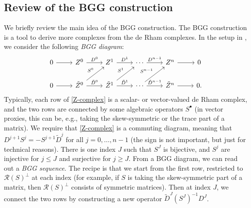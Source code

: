 \documentclass[final]{amsart}%
\newcommand{\0}{\mathaccent23}
\newcommand\ran{\mathcal{R}}
\newcommand{\bs}{{\scriptscriptstyle \bullet}}
\begin{document}
\subsection{Review of the BGG construction}

We briefly review the main idea of the BGG construction. The BGG construction is a tool to derive more complexes from the de Rham complexes. In the setup in \cite{arnold2021complexes}, we consider the following {\it BGG diagram}:
\begin{equation}\label{Z-complex}
\begin{tikzcd}
0 \arrow{r} &Z^{0} \arrow{r}{D^{0}} &Z^{1} \arrow{r}{D^{1}} &\cdots \arrow{r}{D^{n-1}} & Z^{n}  \arrow{r}{} & 0\\
0 \arrow{r} &\tilde{Z}^{0}\arrow{r}{\tilde{D}^{0}} \arrow[ur, "S^{0}"]&\tilde{Z}^{1} \arrow{r}{\tilde{D}^{1}} \arrow[ur, "S^{1}"]&\cdots \arrow{r}{\tilde{D}^{n-1}}\arrow[ur, "S^{n-1}"] & \tilde{Z}^{n} \arrow{r}{} & 0.
 \end{tikzcd}
\end{equation}
Typically, each row of \eqref{Z-complex} is a scalar- or vector-valued de Rham complex, and the two rows are connected by some algebraic operators $S^{\bs}$ (in vector proxies, this can be, e.g., taking the skew-symmetric or the trace part of a matrix). We require that \eqref{Z-complex} is a commuting diagram, meaning that $D^{j+1}S^j=-S^{j+1}\tilde D^j$ for all $j=0,\ldots,n-1$ (the sign is not important, but just for technical reasons).
There is one index $J$ such that $S^{J}$ is bijective, and $S^{j}$ are injective for $j\leq J$ and surjective for $j\geq J$. From a BGG diagram, we can read out a {\it BGG sequence}. The recipe is that we start from the first row, restricted to $\ran(S)^{\perp}$ at each index (for example, if $S$ is taking the skew-symmetric part of a matrix, then $\ran(S)^{\perp}$ consists of symmetric matrices). Then at index $J$, we connect the two rows by constructing a new operator $\tilde{D}^J(S^{J})^{-1}D^J$. 
\end{document}
